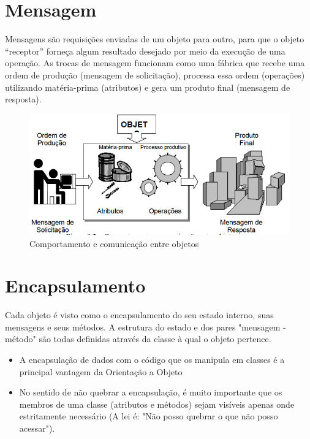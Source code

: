 \section{Mensagem}

Mensagens são requisições enviadas de um objeto para outro, para que o objeto ``receptor'' forneça algum resultado desejado por meio da execução de uma operação. As trocas de mensagem funcionam como uma fábrica que
recebe uma ordem de produção (mensagem de solicitação), processa essa ordem (operações) utilizando matéria-prima (atributos) e gera um produto final (mensagem de resposta).

\begin{figure}[H]
  \centering
  \includegraphics[scale=0.5]{imagens/analogia-mensagens.png}
  \caption{Comportamento e comunicação entre objetos}
  \label{}
\end{figure}

\section{Encapsulamento}

Cada objeto é visto como o encapsulamento do seu estado interno, suas mensagens e seus métodos. A estrutura do estado e dos pares "mensagem - método" são todas definidas através da classe à qual o objeto pertence.

\begin{itemize}
  \item A encapsulação de dados com o código que os manipula em classes é a principal vantagem da Orientação a Objeto
  \item No sentido de não quebrar a encapsulação, é muito importante que os membros de uma classe (atributos e métodos) sejam visíveis apenas onde estritamente necessário (A lei é: "Não posso quebrar o que não posso acessar").
\end{itemize}

